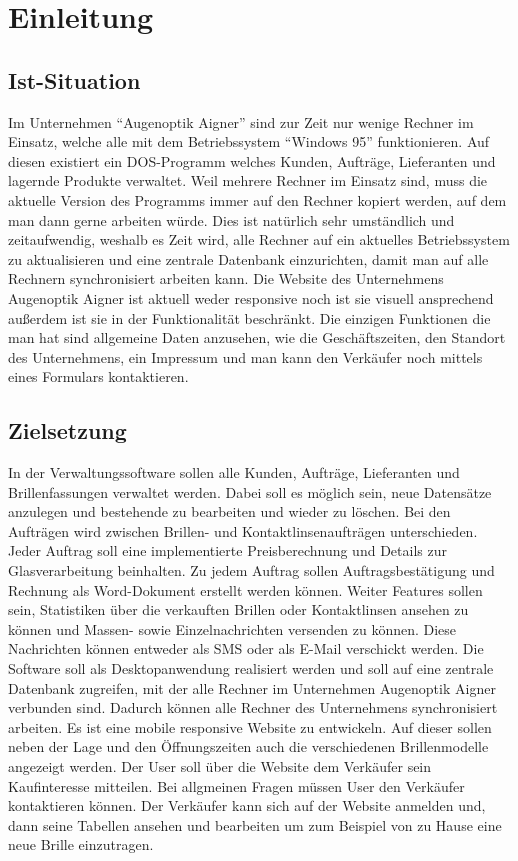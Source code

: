 \chapter{Einleitung}
\section{Ist-Situation}
Im Unternehmen “Augenoptik Aigner” sind zur Zeit nur wenige Rechner im Einsatz, welche alle mit dem Betriebssystem “Windows 95” funktionieren. Auf diesen existiert ein DOS-Programm welches Kunden,  Aufträge, Lieferanten und lagernde Produkte  verwaltet. Weil mehrere Rechner im Einsatz sind, muss die aktuelle Version des Programms immer auf den Rechner kopiert werden, auf dem man dann gerne arbeiten würde. Dies ist natürlich sehr umständlich und zeitaufwendig, weshalb es Zeit wird, alle Rechner auf ein aktuelles Betriebssystem zu aktualisieren und eine zentrale Datenbank einzurichten, damit man auf alle Rechnern synchronisiert arbeiten kann.\newline
Die Website des Unternehmens Augenoptik Aigner ist aktuell weder responsive noch ist sie visuell ansprechend außerdem ist sie in der Funktionalität beschränkt. Die einzigen Funktionen die man hat sind allgemeine Daten anzusehen, wie die Geschäftszeiten, den Standort des Unternehmens, ein Impressum und man kann den Verkäufer noch mittels eines Formulars kontaktieren. 

\section{Zielsetzung}
In der Verwaltungssoftware sollen alle Kunden, Aufträge, Lieferanten und Brillenfassungen verwaltet werden. Dabei soll es möglich sein, neue Datensätze anzulegen und bestehende zu bearbeiten und wieder zu löschen. Bei den Aufträgen wird zwischen Brillen- und Kontaktlinsenaufträgen unterschieden. Jeder Auftrag soll eine implementierte Preisberechnung und Details zur Glasverarbeitung beinhalten. Zu jedem Auftrag sollen Auftragsbestätigung und Rechnung als Word-Dokument erstellt werden können. \newline Weiter Features sollen sein, Statistiken über die verkauften Brillen oder Kontaktlinsen ansehen zu können und Massen- sowie Einzelnachrichten versenden zu können. Diese Nachrichten können entweder als SMS oder als E-Mail verschickt werden. \newline Die Software soll als Desktopanwendung realisiert werden und soll auf eine zentrale Datenbank zugreifen, mit der alle Rechner im Unternehmen Augenoptik Aigner verbunden sind. Dadurch können alle Rechner des Unternehmens synchronisiert arbeiten.
Es ist eine mobile responsive Website zu entwickeln. Auf dieser sollen neben der Lage und den Öffnungszeiten auch die verschiedenen Brillenmodelle angezeigt werden. Der User soll über die Website dem Verkäufer sein Kaufinteresse mitteilen. Bei allgmeinen Fragen müssen User den Verkäufer kontaktieren können. Der Verkäufer kann sich auf der Website anmelden und, dann seine Tabellen ansehen und bearbeiten um zum Beispiel von zu Hause eine neue Brille einzutragen. 

